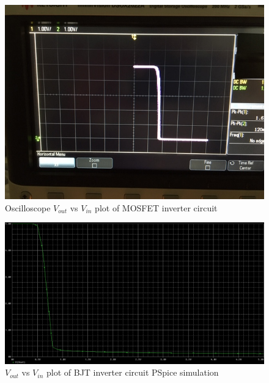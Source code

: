 \documentclass{article}
\begin{document}
\begin{figure}[H]
  \centering
  \includegraphics[width=\textwidth]{ECE2200L_Lab9_PSpice_scope_A.JPG}
  \caption{Oscilloscope $V_{out}$ vs $V_{in}$ plot of MOSFET inverter circuit}
  \label{fig:plota}
\end{figure}

\begin{figure}[H]
  \centering
  \includegraphics[width=\textwidth]{ECE2200L_Lab9_PSpice_plot_B.png}
  \caption{$V_{out}$ vs $V_{in}$ plot of BJT inverter circuit PSpice simulation}
  \label{fig:plotb}
\end{figure}
\end{document}
